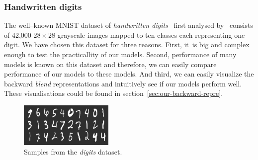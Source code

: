 \subsubsection{Handwritten digits} 
\label{sec:datasets-digits} 

The well--known MNIST dataset of \emph{handwritten digits}~\citep{digits2014mnist} first analysed by~\citet{lecun1998gradient} consists of 42,000 $28 \times 28$ grayscale images mapped to ten classes each representing one digit. We have chosen this dataset for three reasons. First, it~is big and complex enough to test the practicallity of our models. Second, performance of many models is known on this dataset and therefore, we can easily compare performance of our models to these models. And third, we can easily visualize the backward \emph{blend} representations and intuitively see if our models perform well. These visualisations could be found in section~\ref{sec:our-backward-repre}. 

\begin{figure}[H]
  \centering
  \includegraphics[width=0.4\textwidth]{img/digits.png} 
  \caption{Samples from the \emph{digits} dataset.}
  \label{fig:datasets-digits}
\end{figure}


